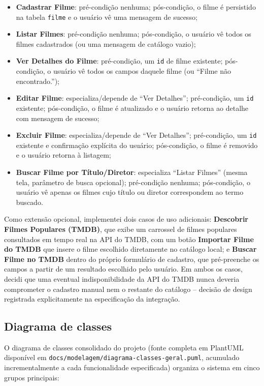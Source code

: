 \documentclass[12pt,a4paper]{article}
\begin{document}
\begin{itemize}
    \item \textbf{Cadastrar Filme}: pré-condição nenhuma; pós-condição, o filme é persistido na
        tabela \texttt{filme} e o usuário vê uma mensagem de sucesso;
    \item \textbf{Listar Filmes}: pré-condição nenhuma; pós-condição, o usuário vê todos os
        filmes cadastrados (ou uma mensagem de catálogo vazio);
    \item \textbf{Ver Detalhes do Filme}: pré-condição, um \texttt{id} de filme existente;
        pós-condição, o usuário vê todos os campos daquele filme (ou ``Filme não encontrado.'');
    \item \textbf{Editar Filme}: especializa/depende de ``Ver Detalhes''; pré-condição, um
        \texttt{id} existente; pós-condição, o filme é atualizado e o usuário retorna ao detalhe
        com mensagem de sucesso;
    \item \textbf{Excluir Filme}: especializa/depende de ``Ver Detalhes''; pré-condição, um
        \texttt{id} existente e confirmação explícita do usuário; pós-condição, o filme é
        removido e o usuário retorna à listagem;
    \item \textbf{Buscar Filme por Título/Diretor}: especializa ``Listar Filmes'' (mesma tela,
        parâmetro de busca opcional); pré-condição nenhuma; pós-condição, o usuário vê apenas os
        filmes cujo título ou diretor correspondem ao termo buscado.
\end{itemize}

Como extensão opcional, implementei dois casos de uso adicionais: \textbf{Descobrir Filmes
Populares (TMDB)}, que exibe um carrossel de filmes populares consultados em tempo real na API
do TMDB, com um botão \textbf{Importar Filme do TMDB} que insere o filme escolhido diretamente
no catálogo local; e \textbf{Buscar Filme no TMDB} dentro do próprio formulário de cadastro, que
pré-preenche os campos a partir de um resultado escolhido pelo usuário. Em ambos os casos,
decidi que uma eventual indisponibilidade da API do TMDB nunca deveria comprometer o cadastro
manual nem o restante do catálogo -- decisão de design registrada explicitamente na
especificação da integração.

\subsection{Diagrama de classes}

O diagrama de classes consolidado do projeto (fonte completa em PlantUML disponível em
\texttt{docs/modelagem/diagrama-classes-geral.puml}, acumulado incrementalmente a cada
funcionalidade especificada) organiza o sistema em cinco grupos principais:
\end{document}
